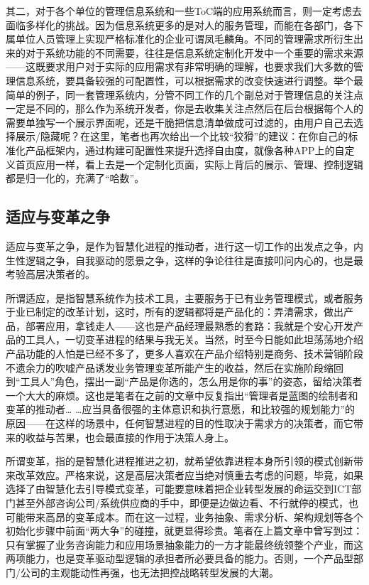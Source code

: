 \documentclass[
]{book}
\begin{document}
其二，对于各个单位的管理信息系统和一些ToC端的应用系统而言，则一定考虑去面临多样化的挑战。因为信息系统更多的是对人的服务管理，而能在各部门，各下属单位人员管理上实现严格标准化的企业可谓凤毛麟角。不同的管理需求所衍生出来的对于系统功能的不同需要，往往是信息系统定制化开发中一个重要的需求来源------这既要求用户对于实际的应用需求有非常明确的理解，也要求我们大多数的管理信息系统，要具备较强的可配置性，可以根据需求的改变快速进行调整。举个最简单的例子，同一套管理系统内，分管不同工作的几个副总对于管理信息的关注点一定是不同的，那么作为系统开发者，你是去收集关注点然后在后台根据每个人的需要单独写一个展示界面呢，还是干脆把信息清单做成可过滤的，由用户自己去选择展示/隐藏呢？在这里，笔者也再次给出一个比较``狡猾''的建议：在你自己的标准化产品框架内，通过构建可配置性来提升选择自由度，就像各种APP上的自定义首页应用一样，看上去是一个定制化页面，实际上背后的展示、管理、控制逻辑都是归一化的，充满了``哈数''。

\hypertarget{ux9002ux5e94ux4e0eux53d8ux9769ux4e4bux4e89}{%
\subsection{适应与变革之争}\label{ux9002ux5e94ux4e0eux53d8ux9769ux4e4bux4e89}}

适应与变革之争，是作为智慧化进程的推动者，进行这一切工作的出发点之争，内生性逻辑之争，自我驱动的愿景之争，这样的争论往往是直接叩问内心的，也是最考验高层决策者的。

所谓适应，是指智慧系统作为技术工具，主要服务于已有业务管理模式，或者服务于业已制定的改革计划，这时，所有的逻辑都将是产品化的：弄清需求，做出产品，部署应用，拿钱走人------这也是产品经理最熟悉的套路：我就是个安心开发产品的工具人，一切变革进程的结果与我无关。当然，时至今日能如此坦荡荡地介绍产品功能的人怕是已经不多了，更多人喜欢在产品介绍特别是商务、技术营销阶段不遗余力的吹嘘产品诱发业务管理变革所能产生的收益，然后在实施阶段缩回到``工具人''角色，摆出一副``产品是你选的，怎么用是你的事''的姿态，留给决策者一个大大的麻烦。这也是笔者在之前的文章中反复指出``管理者是蓝图的绘制者和变革的推动者\ldots{} \ldots 应当具备很强的主体意识和执行意愿，和比较强的规划能力''的原因------在这样的场景中，任何智慧进程的目的性取决于需求方的决策者，而它带来的收益与苦果，也会最直接的作用于决策人身上。

所谓变革，指的是智慧化进程推进之初，就希望依靠进程本身所引领的模式创新带来改革效应。严格来说，这是高层决策者应当绝对慎重去考虑的问题，毕竟，如果选择了由智慧化去引导模式变革，可能要意味着把企业转型发展的命运交到ICT部门甚至外部咨询公司/系统供应商的手中，即便是边做边看、不行就停的模式，也可能带来高昂的变革成本。而在这一过程，业务抽象、需求分析、架构规划等各个初始化步骤中前面``两大争''的碰撞，就更显得珍贵。笔者在上篇文章中曾写到过：只有掌握了业务咨询能力和应用场景抽象能力的一方才能最终统领整个产业，而这两项能力，也是变革驱动型逻辑的承担者所必要具备的能力。否则，一个产品型部门/公司的主观能动性再强，也无法把控战略转型发展的大潮。
\end{document}
